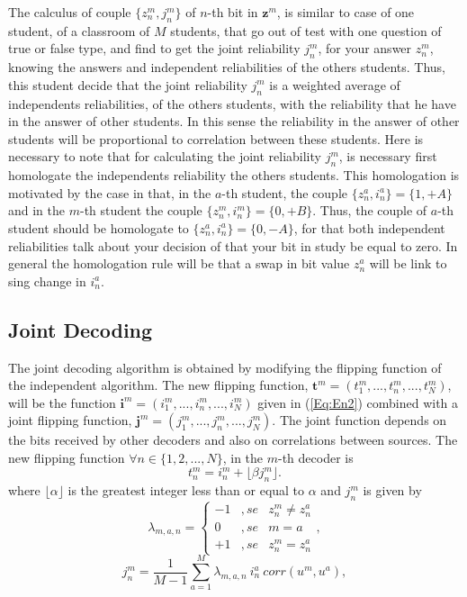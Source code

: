 \documentclass[journal]{IEEEtran}
\begin{document}
The calculus of couple $\{z_{n}^{m},j_{n}^{m}\}$ of $n$-th bit in $\mathbf{z}^{m}$,
is similar to case of one student, of a classroom of $M$ students, that go out of test
with one question of true or false type, and find to get the joint reliability  $j_{n}^{m}$,
for your answer $z_{n}^{m}$, knowing the answers and independent reliabilities of the others students. 
Thus, this student decide that the joint reliability  $j_{n}^{m}$ is a weighted average
of independents reliabilities, of the others students, with the reliability that he have
in the answer of other students. In this sense the reliability in the answer of other students 
will be proportional to correlation between these students. Here is necessary to note that for 
calculating the joint reliability  $j_{n}^{m}$, is necessary first homologate the independents
reliability  the others students. This homologation is motivated by the case in that,
in the $a$-th student, the couple $\{z_{n}^{a},i_{n}^{a}\}=\{1,+A\}$  and  in the $m$-th student 
the couple $\{z_{n}^{m},i_{n}^{m}\}=\{0,+B\}$. Thus, the couple of $a$-th student should 
be homologate to $\{z_{n}^{a},i_{n}^{a}\}=\{0,-A\}$, for that both independent reliabilities
talk about your decision of that your bit in study be equal to  zero. In general the homologation rule 
will be that a swap in bit value $z_{n}^{a}$ will be link to sing change in $i_{n}^{a}$.

\subsection{Joint Decoding}
\label{Subsec:AlgDecConj}

The joint decoding algorithm is obtained by modifying the flipping function of the 
independent algorithm.
The new flipping function, $\mathbf{t}^m=({t}^{m}_1, ..., {t}^{m}_n, ..., {t}^{m}_N)$, 
will be the function  
$\mathbf{i}^m=({i}^{m}_1, ..., {i}^{m}_n, ..., {i}^{m}_N)$ given in 
(\ref{Eq:En2}) combined with a joint flipping function, $\mathbf{j}^m=({j}^{m}_1, ..., {j}^{m}_n, ..., {j}^{m}_N)$.
The joint function depends on the bits received by other decoders and also on 
correlations between sources. The new flipping function $\forall n \in \{1, 2, ..., N\}$, in the $m$-th decoder is 
\begin{equation}\label{eq:DSPHBF381}
{t}^{m}_n={i}^{m}_n+ \lfloor \beta  {j}^{m}_n   \rfloor.
\end{equation}
where $\lfloor \alpha \rfloor$ is the greatest integer less than or equal to $\alpha$ and ${j}^{m}_n$ is given by
\begin{equation}\label{eq:DSPHBF1}
{\lambda}^{~}_{m,a,n}=\left \{
\begin{matrix}
-1 & , se & z^m_n \neq z^a_n \\ 
 0 & , se & m=a \\ 
+1 & , se & z^m_n = z^a_n 
\end{matrix}
\right. ,
\end{equation}
\begin{equation}\label{eq:DSPHBF2}
{j}^m_n=\frac{1}{M-1} \sum^{M}_{a=1}{{\lambda}^{~}_{m,a,n}~{i}^a_n ~ corr(u^m,u^a)} ,
\end{equation}
\end{document}
